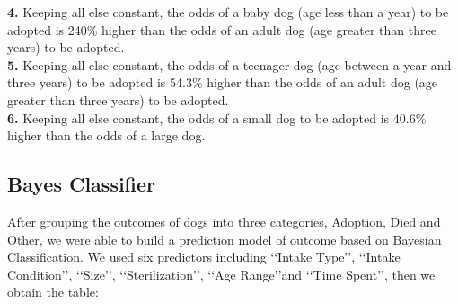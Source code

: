 \documentclass[12pt]{article}
\begin{document}
\begin{flushleft}
\textbf{4.} Keeping all else constant, the odds of a baby dog (age less than a year) to be adopted is 240\% higher than the odds of an adult dog (age greater than three years) to be adopted.\\
 
\textbf{5.} Keeping all else constant, the odds of a teenager dog (age between a year and three years) to be adopted is 54.3\% higher than the odds of an adult dog (age greater than three years) to be adopted.\\
 
\textbf{6.} Keeping all else constant, the odds of a small dog to be adopted is 40.6\% higher than the odds of a large dog.\\
\bigskip

\subsection{Bayes Classifier}
After grouping the outcomes of dogs into three categories, Adoption, Died and Other, we were able to build a prediction model of outcome based on Bayesian Classification. We used six predictors including \lq\lq Intake Type\rq\rq, \lq\lq Intake Condition\rq\rq, \lq\lq Size\rq\rq, \lq\lq Sterilization\rq\rq, \lq\lq Age Range\rq\rq and \lq\lq Time Spent\rq\rq, then we obtain the table:\\


\end{flushleft}
\end{document}
